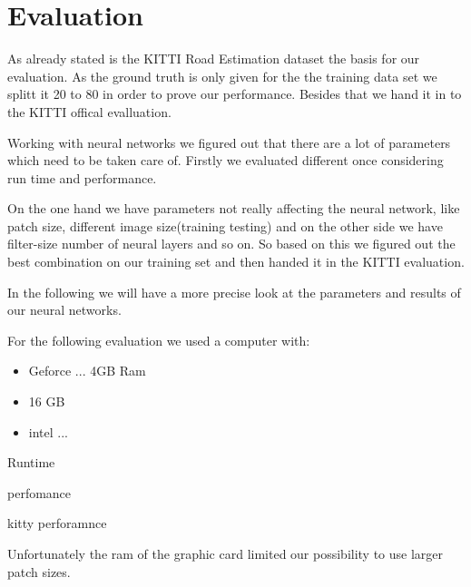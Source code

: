 
\section{Evaluation}\label{sec:evaluation}

As already stated is the KITTI Road Estimation dataset the basis for our evaluation. As the ground truth is only given for the the training data set we splitt it 20 to 80 in order to prove our performance. Besides that we hand it in to the KITTI offical evalluation.

Working with neural networks we figured out that there are a lot of parameters which need to be taken care of. Firstly we evaluated different once considering run time and performance.

On the one hand we have parameters not really affecting the neural network, like patch size, different image size(training testing) and on the other side
we have filter-size number of neural layers and so on.
So based on this we figured out the best combination on our training set and then handed it in the KITTI evaluation.

In the following we will have a more precise look at the parameters and results of our neural networks.

For the following evaluation we used a computer with:
\begin{itemize}
\item Geforce ... 4GB Ram
\item 16 GB
\item intel ...
\end{itemize}

Runtime


perfomance


kitty perforamnce


Unfortunately the ram of the graphic card limited our possibility to use larger patch sizes.

